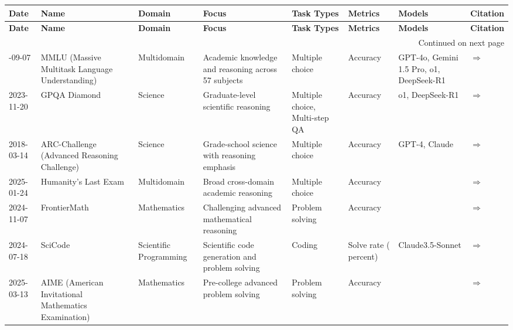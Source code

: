 \documentclass{article}
\begin{document}
\begin{landscape}
{\footnotesize
\begin{longtable}{|p{1.5cm}|p{2.5cm}|p{2cm}|p{2cm}|p{3cm}|p{2cm}|p{2cm}|p{1cm}|}
\hline
{\bf Date} & {\bf Name} & {\bf Domain} & {\bf Focus} & {\bf Task Types} & {\bf Metrics} & {\bf Models} & {\bf Citation} \\ \hline
\endfirsthead
\hline
{\bf Date} & {\bf Name} & {\bf Domain} & {\bf Focus} & {\bf Task Types} & {\bf Metrics} & {\bf Models} & {\bf Citation} \\ \hline
\endhead
\hline
\multicolumn{8}{r}{Continued on next page} \\
\endfoot
\hline
\endlastfoot
2020-09-07 & MMLU (Massive Multitask Language Understanding) & Multidomain & Academic knowledge and reasoning across 57 subjects & Multiple choice & Accuracy & GPT-4o, Gemini 1.5 Pro, o1, DeepSeek-R1 & \cite{hendrycks2021measuring} \href{https://arxiv.org/abs/2009.03300}{$\Rightarrow$ } \\ \hline
2023-11-20 & GPQA Diamond & Science & Graduate-level scientific reasoning & Multiple choice, Multi-step QA & Accuracy & o1, DeepSeek-R1 & \cite{rein2023gpqagraduatelevelgoogleproofqa} \href{https://arxiv.org/abs/2311.12022}{$\Rightarrow$ } \\ \hline
2018-03-14 & ARC-Challenge (Advanced Reasoning Challenge) & Science & Grade-school science with reasoning emphasis & Multiple choice & Accuracy & GPT-4, Claude & \cite{clark2018think} \href{https://allenai.org/data/arc}{$\Rightarrow$ } \\ \hline
2025-01-24 & Humanity's Last Exam & Multidomain & Broad cross-domain academic reasoning & Multiple choice & Accuracy &  & \cite{phan2025humanitys} \href{https://arxiv.org/abs/2501.14249}{$\Rightarrow$ } \\ \hline
2024-11-07 & FrontierMath & Mathematics & Challenging advanced mathematical reasoning & Problem solving & Accuracy &  & \cite{glazer2024frontiermath} \href{https://arxiv.org/abs/2411.04872}{$\Rightarrow$ } \\ \hline
2024-07-18 & SciCode & Scientific Programming & Scientific code generation and problem solving & Coding & Solve rate ( percent) & Claude3.5-Sonnet & \cite{tian2024scicode} \href{https://arxiv.org/abs/2407.13168}{$\Rightarrow$ } \\ \hline
2025-03-13 & AIME (American Invitational Mathematics Examination) & Mathematics & Pre-college advanced problem solving & Problem solving & Accuracy &  & \cite{www-aime} \href{https://www.vals.ai/benchmarks/aime-2025-03-13}{$\Rightarrow$ } \\ \hline

\end{longtable}}
\end{landscape}
\end{document}
